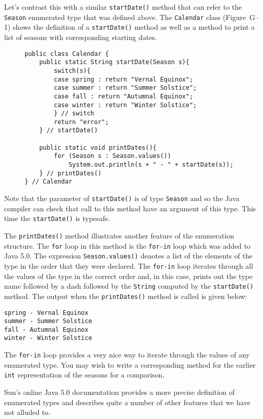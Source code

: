 Let's contrast this with a similar {\tt startDate()} method that
can refer to the {\tt Season} enumerated type that was defined above. 
The {\tt Calendar} class (Figure~G--1) shows the definition of 
a {\tt startDate()} method as well as a method to print a list of 
seasons with corresponding starting dates.
\begin{figure}[h!]
\jjjprogstart
\begin{jjjlisting}
\begin{lstlisting}
public class Calendar {
    public static String startDate(Season s){
        switch(s){
        case spring : return "Vernal Equinox";
        case summer : return "Summer Solstice";
        case fall : return "Autumnal Equinox";
        case winter : return "Winter Solstice";
        } // switch
        return "error";
    } // startDate()
 
    public static void printDates(){
        for (Season s : Season.values())
            System.out.println(s + " - " + startDate(s));
    } // printDates()
} // Calendar
\end{lstlisting}
\end{jjjlisting}
\end{figure}
Note that the parameter of {\tt startDate()} is of type {\tt Season}
and so the Java compiler can check that call to this method have
an argument of this type.  This time the {\tt startDate()} is typesafe.

The {\tt printDates()} method illustrates another feature of the 
enumeration structure.  The {\tt for} loop in this method is the 
{\tt for-in} loop which was added to Java 5.0.  The expression
{\tt Season.values()} denotes a list of the elements of the
type in the order that they were declared.  The {\tt for-in} loop
iterates through all the values of the type in the correct order and,
in this case, prints out the type name followed by a dash followed
by the {\tt String} computed by the {\tt startDate()} method. 
The output when the {\tt printDates()} method is called is given below: 

\begin{jjjlisting}
\begin{lstlisting}
spring - Vernal Equinox
summer - Summer Solstice
fall - Autumnal Equinox
winter - Winter Solstice
\end{lstlisting}
\end{jjjlisting}

The {\tt for-in} loop provides a very nice way to iterate through the
values of any enumerated type. You may wish to write a corresponding 
method for the  earlier {\tt int} representation of the seasons for a
comparison.

Sun's online Java 5.0 documentation provides a more precise definition of 
enumerated types and describes quite a number of other features that we
have not alluded to.


